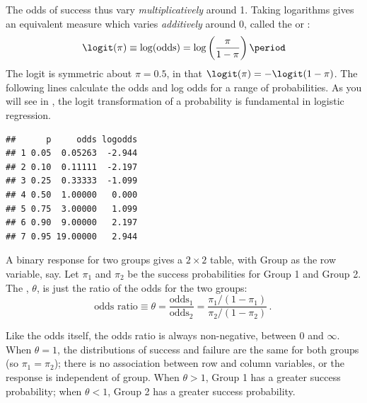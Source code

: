 \documentclass[11pt]{book}
\renewenvironment{knitrout}{\small\renewcommand{\baselinestretch}{.85}}{} %
\begin{document}
The odds of success thus vary \emph{multiplicatively} around 1.  Taking logarithms
gives an equivalent measure which varies \emph{additively} around 0, called the
 or : 
\begin{equation}\label{eq:logit}
 \logit (\pi) \equiv \log (\mbox{odds}) = \log \left( \frac{\pi}{1-\pi} \right)
 \period
\end{equation}
The logit is symmetric about $\pi = 0.5$, in that
$\logit (\pi) = - \logit (1-\pi)$.  The following lines calculate the odds
and log odds for a range of probabilities. As you will see in
, the logit transformation of a probability is fundamental
in logistic regression.

\begin{knitrout}
\color{fgcolor}\begin{kframe}
\begin{alltt}
 \hlkwb{<-} \hlstd{(}\hlstd{,} \hlstd{,} \hlstd{,} \hlstd{,} \hlstd{,} \hlstd{,} \hlstd{)}
 \hlkwb{<-}  \hlopt{/} \hlstd{(}\hlopt{-}
 \hlkwb{<-} 
\end{alltt}
\begin{verbatim}
##      p     odds logodds
## 1 0.05  0.05263  -2.944
## 2 0.10  0.11111  -2.197
## 3 0.25  0.33333  -1.099
## 4 0.50  1.00000   0.000
## 5 0.75  3.00000   1.099
## 6 0.90  9.00000   2.197
## 7 0.95 19.00000   2.944
\end{verbatim}
\end{kframe}
\end{knitrout}

A binary response for two groups gives a $2 \times 2$ table, with
Group as the row variable, say.  Let $\pi_1$ and $\pi_2$ be the
success probabilities for Group 1 and Group 2.  The , $\theta$,
is just the ratio of the odds for the two groups:
\begin{equation*}%
 \mbox{odds ratio} \equiv \theta =
 \frac{\mbox{odds}_1} {\mbox{odds}_2} =
 \frac{\pi_1 / (1-\pi_1)} {\pi_2 / (1-\pi_2)}
 \period
\end{equation*}

Like the odds itself, the odds ratio is always non-negative, between
0 and $\infty$.  When $\theta = 1$, the distributions of success and
failure are the same for both groups (so $\pi_1 = \pi_2$);  there is
no association between row and column variables, or the response
is independent of group.
When $\theta > 1$, Group 1 has a greater success probability;
when $\theta < 1$, Group 2 has a greater success probability.
\end{document}
